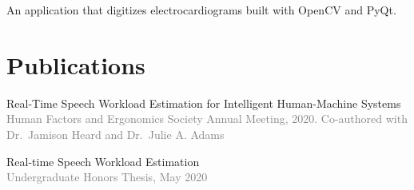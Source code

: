 \documentclass[12pt]{article} %
\renewcommand{\emph}[1]{%
  \textcolor{gray}{#1}%
}
\begin{document}
\begin{paracol}{2}
\begin{raggedright}
An application that digitizes electrocardiograms built with OpenCV and
PyQt.

\hypertarget{publications}{%
\section{Publications}\label{publications}}

\vspace{1pt}

Real-Time Speech Workload Estimation for Intelligent Human-Machine
Systems\\
\emph{Human Factors and Ergonomics Society Annual Meeting, 2020.
Co-authored with Dr.~Jamison Heard and Dr.~Julie A. Adams}

Real-time Speech Workload Estimation\\
\emph{Undergraduate Honors Thesis, May 2020}

\end{raggedright}
\end{paracol}
\end{document}
